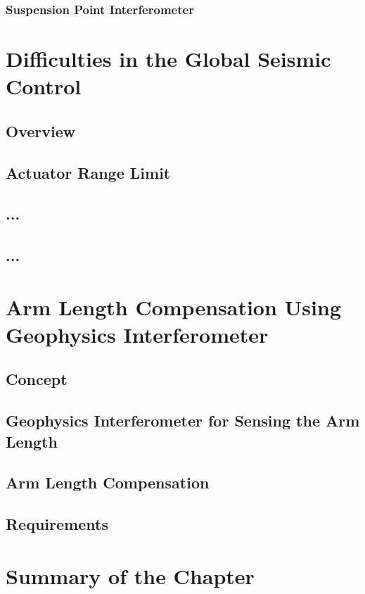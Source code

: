 \subsubsection{Suspension Point Interferometer}

%
\section{Difficulties in the Global Seismic Control}
\subsection{Overview}
\subsection{Actuator Range Limit}
\subsection{...}
\subsection{...}


%
\section{Arm Length Compensation Using Geophysics Interferometer}
\subsection{Concept}
\subsection{Geophysics Interferometer for Sensing the Arm Length}
\subsection{Arm Length Compensation}
\subsection{Requirements}


\section{Summary of the Chapter}
